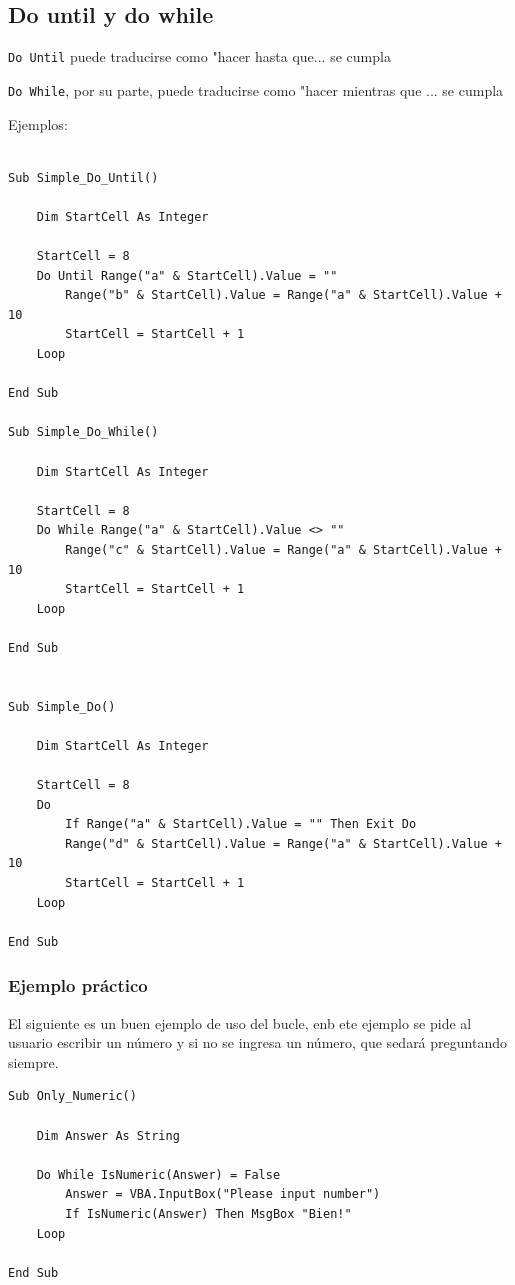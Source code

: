 \subsection{Do until y do while}

\texttt{Do Until} puede traducirse como "hacer hasta que... se cumpla


\texttt{Do While}, por su parte, puede traducirse como "hacer mientras que ... se cumpla


Ejemplos:

\begin{verbatim}

Sub Simple_Do_Until()

    Dim StartCell As Integer
    
    StartCell = 8
    Do Until Range("a" & StartCell).Value = ""
        Range("b" & StartCell).Value = Range("a" & StartCell).Value + 10
        StartCell = StartCell + 1
    Loop

End Sub

Sub Simple_Do_While()

    Dim StartCell As Integer
    
    StartCell = 8
    Do While Range("a" & StartCell).Value <> ""
        Range("c" & StartCell).Value = Range("a" & StartCell).Value + 10
        StartCell = StartCell + 1
    Loop

End Sub


Sub Simple_Do()

    Dim StartCell As Integer
    
    StartCell = 8
    Do
        If Range("a" & StartCell).Value = "" Then Exit Do
        Range("d" & StartCell).Value = Range("a" & StartCell).Value + 10
        StartCell = StartCell + 1
    Loop

End Sub
\end{verbatim}

\subsubsection{Ejemplo práctico}

El siguiente es un buen ejemplo de uso del bucle, enb ete ejemplo se pide al usuario escribir un número y si no se ingresa un número, que sedará preguntando siempre.


\begin{verbatim}
Sub Only_Numeric()

    Dim Answer As String
    
    Do While IsNumeric(Answer) = False
        Answer = VBA.InputBox("Please input number")
        If IsNumeric(Answer) Then MsgBox "Bien!"
    Loop
    
End Sub
\end{verbatim}


